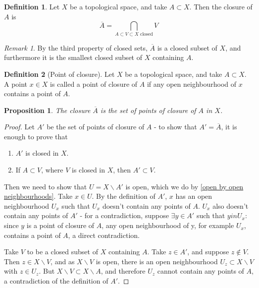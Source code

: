 \documentclass{article}
\theoremstyle{definition}
\newtheorem{defn}{Definition}[section]
\theoremstyle{plain}%
\newtheorem{prop}[thm]{Proposition}
\theoremstyle{remark}
\newtheorem*{rem}{Remark}
\newcommand{\Intersection}{\bigcap}
\begin{document}
\begin{defn}
    Let $X$ be a topological space, and take $A \subset X$. Then the closure of $A$ is \[\overline{A} = \Intersection_{A \subset V \subset X \text{ closed}} V \]
\end{defn}

\begin{rem}
    By the third property of closed sets, $\overline{A}$ is a closed subset of $X$, and furthermore it is the smallest closed subset of $X$ containing $A$.
\end{rem}

\begin{defn}[Point of closure]
    Let $X$ be a topological space, and take $A \subset X$. A point $x \in X$ is called a point of closure of $A$ if any open neighbourhood of $x$ contains a point of $A$.
\end{defn}

\begin{prop}
    \label{closure of A is points of closure}
    The closure $\overline{A}$ is the set of points of closure of $A$ in $X$.
\end{prop}

\begin{proof}
    Let $A'$ be the set of points of closure of $A$ - to show that $A' = \overline{A}$, it is enough to prove that
    \begin{enumerate}
        \item $A'$ is closed in $X$.
        \item If $A \subset V$, where $V$ is closed in $X$, then $A' \subset V$.
    \end{enumerate}
    
    Then we need to show that $U = X \backslash A'$ is open, which we do by \ref{open by open neighbourhoods}. Take $x \in U$. By the definition of $A'$, $x$ has an open neighbourhood $U_x$ such that $U_x$ doesn't contain any points of $A$. $U_x$ also doesn't contain any points of $A'$ - for a contradiction, suppose $\exists y \in A'$ such that $y in U_x$: since $y$ is a point of closure of $A$, any open neighbourhood of y, for example $U_x$, contains a point of $A$, a direct contradiction.

    Take $V$ to be a closed subset of $X$ containing $A$. Take $z \in A'$, and suppose $z \not \in V$. Then $z \in X \backslash V$, and as $X \backslash V$ is open, there is an open neighbourhood $U_z \subset X \backslash V$ with $z \in U_z$. But $X \backslash V \subset X \backslash A$, and therefore $U_z$ cannot contain any points of $A$, a contradiction of the definition of $A'$.
\end{proof}
\end{document}
